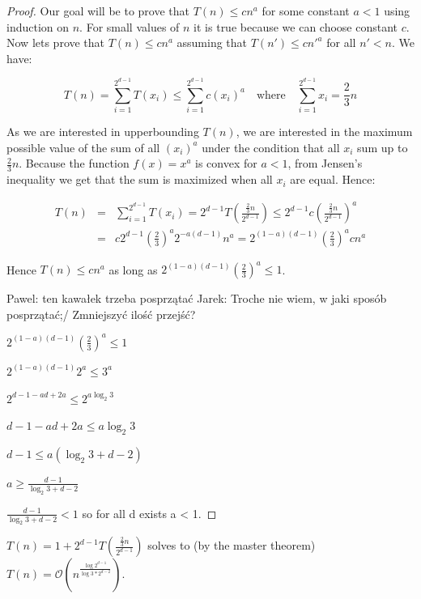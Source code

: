 \documentclass[10pt,a4paper]{article}
\newcommand{\pawel}[1]{\noindent\colorbox{myRed}{Pawel: #1}}
\newcommand{\jarek}[1]{\noindent\colorbox{myYellow}{Jarek: #1}}
\newcommand{\Oh}{\mathcal{O}}
\begin{document}
\begin{proof}

Our goal will be to prove that $T(n) \leq c n^a$ for some constant $a < 1$ using induction on $n$. For small values of $n$ it is true because we can choose constant $c$. Now lets prove that $T(n) \leq c n^a$ assuming that $T(n') \leq c n'^a$ for all $n'<n$. We have:

$$T(n) = \displaystyle\sum\limits_{i=1}^{2^{d-1}} T(x_i)\leq\displaystyle\sum\limits_{i=1}^{2^{d-1}} c(x_i)^{a}  \quad\text{where}\quad  \displaystyle\sum\limits_{i=1}^{2^{d-1}} x_i = \frac{2}{3}n$$ 

As we are interested in upperbounding $T(n)$, we are interested in the maximum possible value of the sum of all $(x_i)^{a}$ under the condition that all $x_{i}$ sum up to $\frac{2}{3}n$. Because the function $f(x)=x^{a}$ is convex for $a<1$, from Jensen's inequality we get that the sum is maximized when all $x_{i}$ are equal. Hence:

\begin{eqnarray*}
T(n) &=& \displaystyle\sum\limits_{i=1}^{2^{d-1}} T(x_i) = 2^{d-1} T\left(\frac{\frac{2}{3}n}{2^{d-1}}\right) \leq 2^{d-1} c \left(\frac{\frac{2}{3}n}{2^{d-1}}\right) ^ a  \\
& = & c 2^{d-1} \left(\frac{2}{3}\right)^a 2^{-a(d-1)} n^a = 2^{(1-a)(d-1)} \left(\frac{2}{3}\right)^a c n^a
\end{eqnarray*}

Hence $T(n)\leq c n^{a}$ as long as $2^{(1-a)(d-1)} (\frac{2}{3})^a \leq 1$.
\bigskip

\pawel{ten kawałek trzeba posprzątać}
\jarek{Troche nie wiem, w jaki sposób posprzątać;/ Zmniejszyć ilość przejść?}

$2^{(1-a)(d-1)} (\frac{2}{3})^a \leq 1$

$2^{(1-a)(d-1)} 2^a \leq 3^a$

$2^{d-1-ad+2a} \leq 2^{a \log_2{3}}$

$d-1-ad+2a \leq a \log_2{3}$

$d-1 \leq a (\log_2{3} + d - 2)$

$a \geq \frac{d-1}{\log_2{3} + d - 2} $

$\frac{d-1}{\log_2{3} + d - 2} < 1$ so for all d exists a < 1.

\end{proof}

$T(n)=1+2^{d-1}T(\frac{\frac{2}{3}n}{2^{d-1}})$ solves to (by the master theorem) $T(n)=\Oh(n^{\frac{\log 2^{d-1}}{\log 3*2^{d-2}}})$.
\end{document}
